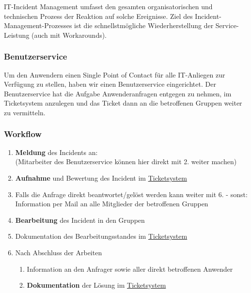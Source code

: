\documentclass[]{article}
\begin{document}
IT-Incident Management umfasst den gesamten organisatorischen und
technischen Prozess der Reaktion auf solche Ereignisse. Ziel des
Incident-Management-Prozesses ist die schnellstmögliche
Wiederherstellung der Service-Leistung (auch mit Workarounds).

\subsubsection{Benutzerservice}\label{benutzerservice}

Um den Anwendern einen Single Point of Contact für alle IT-Anliegen zur
Verfügung zu stellen, haben wir einen Benutzerservice eingerichtet. Der
Benutzerservice hat die Aufgabe Anwenderanfragen entgegen zu nehmen, im
Ticketsystem anzulegen und das Ticket dann an die betroffenen Gruppen
weiter zu vermitteln.

\subsubsection{Workflow}\label{workflow-1}

\begin{enumerate}
\def\labelenumi{\arabic{enumi}.}
\item
  \textbf{Meldung} des Incidents an:\\
  (Mitarbeiter des Benutzerservice können hier direkt mit 2. weiter
  machen)
\item
  \textbf{Aufnahme} und Bewertung des Incident im
  \href{https://docs.google.com/spreadsheets/d/1GDq3AEsVDu1a-X7tEl6qKDtSZdAXm8lsRzY6Ijw-dUQ/edit\#gid=0}{Ticketsystem}
\item
  Falls die Anfrage direkt beantwortet/gelöst werden kann weiter mit 6.
  - sonst:\\
  Information per Mail an alle Mitglieder der betroffenen Gruppen
\item
  \textbf{Bearbeitung} des Incident in den Gruppen
\item
  Dokumentation des Bearbeitungsstandes im
  \href{https://docs.google.com/spreadsheets/d/1GDq3AEsVDu1a-X7tEl6qKDtSZdAXm8lsRzY6Ijw-dUQ/edit\#gid=0}{Ticketsystem}
\item
  Nach Abschluss der Arbeiten

  \begin{enumerate}
  \def\labelenumii{\alph{enumii}.}
  \item
    Information an den Anfrager sowie aller direkt betroffenen Anwender
  \item
    \textbf{Dokumentation} der Lösung im
    \href{https://docs.google.com/spreadsheets/d/1GDq3AEsVDu1a-X7tEl6qKDtSZdAXm8lsRzY6Ijw-dUQ/edit\#gid=0}{Ticketsystem}
  \end{enumerate}
\end{enumerate}
\end{document}
